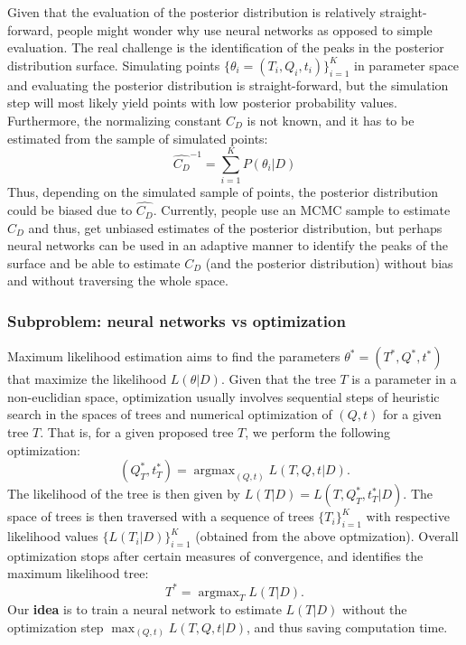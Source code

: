 \documentclass[]{article}
\DeclareMathOperator{\argmax}{argmax}
\begin{document}
Given that the evaluation of the posterior distribution is relatively
straight-forward, people might wonder why use neural networks as opposed
to simple evaluation. The real challenge is the identification of the
peaks in the posterior distribution surface. Simulating points
\(\{\theta_i = (T_i,Q_i,t_i)\}_{i=1}^K\) in parameter space and
evaluating the posterior distribution is straight-forward, but the
simulation step will most likely yield points with low posterior
probability values. Furthermore, the normalizing constant \(C_D\) is not
known, and it has to be estimated from the sample of simulated points:
\[
\widehat{C_D}^{-1} = \sum_{i=1}^K P(\theta_i|D)
\] Thus, depending on the simulated sample of points, the posterior
distribution could be biased due to \(\widehat{C_D}\). Currently, people
use an MCMC sample to estimate \(C_D\) and thus, get unbiased estimates
of the posterior distribution, but perhaps neural networks can be used
in an adaptive manner to identify the peaks of the surface and be able
to estimate \(C_D\) (and the posterior distribution) without bias and
without traversing the whole space.

\hypertarget{subproblem-neural-networks-vs-optimization}{%
\subsubsection{Subproblem: neural networks vs
optimization}\label{subproblem-neural-networks-vs-optimization}}

Maximum likelihood estimation aims to find the parameters
\(\theta^* = (T^*,Q^*,t^*)\) that maximize the likelihood
\(L(\theta|D)\). Given that the tree \(T\) is a parameter in a
non-euclidian space, optimization usually involves sequential steps of
heuristic search in the spaces of trees and numerical optimization of
\((Q,t)\) for a given tree \(T\). That is, for a given proposed tree
\(T\), we perform the following optimization: \[
(Q^*_T,t^*_T) = \argmax_{(Q,t)} L(T,Q,t|D).
\] The likelihood of the tree is then given by
\(L(T|D) = L(T,Q^*_T,t^*_T|D)\). The space of trees is then traversed
with a sequence of trees \(\{T_i\}_{i=1}^K\) with respective likelihood
values \(\{L(T_i|D)\}_{i=1}^K\) (obtained from the above optmization).
Overall optimization stops after certain measures of convergence, and
identifies the maximum likelihood tree: \[
T^* = \argmax_T L(T|D).
\] Our \textbf{idea} is to train a neural network to estimate \(L(T|D)\)
without the optimization step \(\max_{(Q,t)} L(T,Q,t|D)\), and thus
saving computation time.
\end{document}

